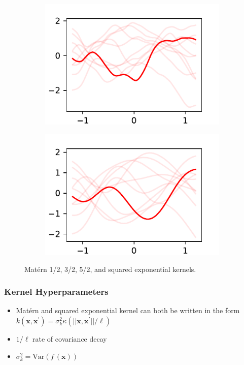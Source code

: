 \documentclass{beamer}
\begin{document}
\begin{frame}
\begin{figure}
\begin{subfigure}[t]{0.4\textwidth}
            \includegraphics[width=\textwidth]{maternfivehalves_kernel.pdf}
        \end{subfigure}%
        \begin{subfigure}[t]{0.4\textwidth}
            \centering
            \includegraphics[width=\textwidth]{exponentiated_kernel.pdf}
        \end{subfigure}%
        \caption{
            Mat\'ern 1/2, 3/2, 5/2, and squared exponential kernels.
        }
    \end{figure}
\end{frame}

\begin{frame}
    \frametitle{Kernel Hyperparameters}
    \begin{itemize}
        \item Mat\'ern and squared exponential kernel can both be written in the
              form $k(\mathbf{x}, \mathbf{x}^\prime)
                  = \sigma_k^2\kappa(||\mathbf{x}, \mathbf{x}^\prime||/\ell)$
        \item $1/\ell$ rate of covariance decay
        \item $\sigma_k^2 = \mathrm{Var}(f\,(\mathbf{x}))$
    \end{itemize}
\end{frame}
\end{document}
